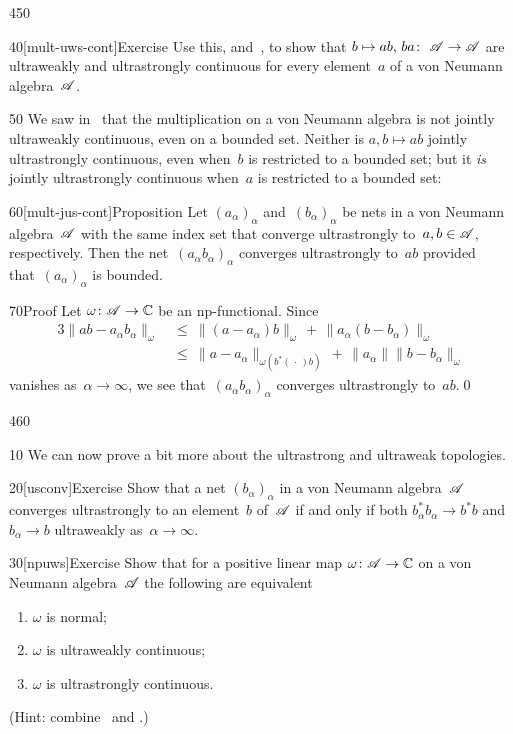 \begin{parsec}{450}
\begin{point}{40}[mult-uws-cont]{Exercise}
Use this,
and~,
to
show that $b\mapsto ab,\,ba\colon\ \scrA\to\scrA$
are ultraweakly and ultrastrongly continuous
for every element~$a$ of a von Neumann algebra~$\mathscr{A}$.
\end{point}
\begin{point}{50}%
We saw in~
that the multiplication on a von Neumann algebra 
is not jointly ultraweakly continuous,
even on a bounded set.
Neither is $a,b\mapsto ab$ jointly ultrastrongly continuous,
even when~$b$ is restricted to a bounded set;
but it \emph{is} jointly 
ultrastrongly continuous when~$a$ is restricted to a bounded set:
\end{point}
\begin{point}{60}[mult-jus-cont]{Proposition}%
Let $(a_\alpha)_\alpha$
and~$(b_\alpha)_\alpha$
be nets
in a von Neumann algebra~$\mathscr{A}$
with the same index set
that converge ultrastrongly to~$a,b\in\mathscr{A}$, respectively.
Then the net~$(a_\alpha b_\alpha)_\alpha$
converges ultrastrongly to~$ab$
provided that~$(a_\alpha)_\alpha$
is bounded.
\begin{point}{70}{Proof}%
Let $\omega\colon \mathscr{A}\to\mathbb{C}$
be an np-functional.
Since
\begin{alignat*}{3}
\|ab-a_\alpha b_\alpha\|_\omega
\ &\leq\ 
	\|(a -a_\alpha)b\|_\omega
	\,+\, 
	\|a_\alpha(b-b_\alpha)\|_\omega
	\\
\ &\leq\ 
	\|a -a_\alpha\|_{\omega(b^*(\,\cdot\,)b)}
	\,+\, 
	\|a_\alpha\|\|b-b_\alpha\|_\omega
\end{alignat*}
vanishes as~$\alpha\to\infty$,
	we see that~$(a_\alpha b_\alpha)_\alpha$
converges ultrastrongly to~$ab$.\qed
\end{point}
\end{point}
\end{parsec}
\begin{parsec}{460}%
\begin{point}{10}%
We can now prove a bit more 
about the ultrastrong and ultraweak topologies.
\end{point}
\begin{point}{20}[usconv]{Exercise}%
Show that a net $(b_\alpha)_\alpha$ 
in a von Neumann algebra~$\mathscr{A}$
converges ultrastrongly to an element~$b$
of~$\mathscr{A}$
if and only if
both $b_\alpha^*b_\alpha\longrightarrow b^*b$
and~$b_\alpha\longrightarrow b$
ultraweakly as~$\alpha\to\infty$.
\end{point}
\begin{point}{30}[npuws]{Exercise}%
%
Show that for a positive linear map $\omega \colon \mathscr{A}\to\mathbb{C}$
on a von Neumann algebra~$\mathscr{A}$
the following are equivalent
\begin{enumerate}
\item
	$\omega$ is normal;
\item
	$\omega$ is ultraweakly continuous;
\item
	$\omega$ is ultrastrongly continuous.
\end{enumerate}
(Hint: combine~ and .)
\end{point}
\end{parsec}
